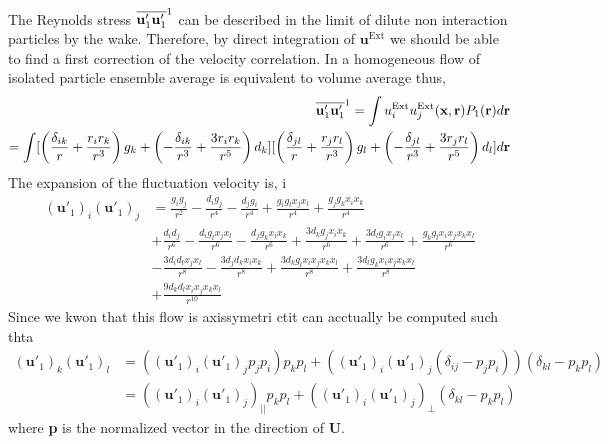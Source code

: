 The Reynolds stress $\overline{\textbf{u}_1'\textbf{u}_1'}^1$ can be described in the limit of dilute non interaction particles by the wake. 
Therefore, by direct integration of $\textbf{u}^\text{Ext}$ we should be able to find a first correction of the velocity correlation. 
In a homogeneous flow of isolated particle ensemble average is equivalent to volume average thus, 
\begin{align*}
    \overline{\textbf{u}_1' \textbf{u}_1' }^1
    = \int u_i^\text{Ext} u_j^\text{Ext}(\textbf{x},\textbf{r}) P_1(\textbf{r}) d\textbf{r}\\
    = \int [\left(\frac{\delta_{ik}}{r} + \frac{r_ir_k}{r^3}\right)  g_k
    + \left(-\frac{\delta_{ik}}{r^3} + \frac{3r_ir_k}{r^5}\right)  d_k]
    [ \left(\frac{\delta_{jl}}{r} + \frac{r_jr_l}{r^3}\right)  g_l
    + \left(-\frac{\delta_{jl}}{r^3} + \frac{3r_jr_l}{r^5}\right)  d_l] d\textbf{r}
\end{align*}
The expansion of the fluctuation velocity is, i
\begin{align*}
    (\textbf{u}'_1)_i 
    (\textbf{u}'_1)_j
    &=
    \frac{g_i g_j}{r^{2}} 
    - \frac{d_i g_j}{r^{4}} 
    - \frac{d_j g_i}{r^{4}} 
    + \frac{g_i g_l x_j x_l}{r^{4}} 
    + \frac{g_j g_k x_i x_k}{r^{4}} \\
    &+ \frac{d_i d_j}{r^{6}} 
    - \frac{d_i g_l x_j x_l}{r^{6}} 
    - \frac{d_j g_k x_i x_k}{r^{6}} 
    + \frac{3 d_k g_j x_i x_k}{r^{6}} 
    + \frac{3 d_l g_i x_j x_l}{r^{6}} 
    + \frac{g_k g_l x_i x_j x_k x_l}{r^{6}} \\
    &- \frac{3 d_i d_l x_j x_l}{r^{8}} 
    - \frac{3 d_j d_k x_i x_k}{r^{8}} 
    + \frac{3 d_k g_l x_i x_j x_k x_l}{r^{8}} 
    + \frac{3 d_l g_k x_i x_j x_k x_l}{r^{8}} \\
    &+ \frac{9 d_k d_l x_i x_j x_k x_l}{r^{10}} 
\end{align*}
Since we kwon that this flow is axissymetri ctit can acctually be computed such thta
\begin{align*}
    (\textbf{u}'_1)_k 
    (\textbf{u}'_1)_l
    &= 
    ((\textbf{u}'_1)_i 
    (\textbf{u}'_1)_j p_j p_i) p_k p_l 
    + 
    ((\textbf{u}'_1)_i 
    (\textbf{u}'_1)_j (\delta_{ij} - p_j p_i))(\delta_{kl} -  p_k p_l )\\
    &= 
    ((\textbf{u}'_1)_i 
    (\textbf{u}'_1)_j )_{||} p_k p_l 
    + 
    ((\textbf{u}'_1)_i 
    (\textbf{u}'_1)_j )_{\bot}(\delta_{kl} -  p_k p_l )
\end{align*} 
where \textbf{p} is the normalized vector in the direction of \textbf{U}. 


